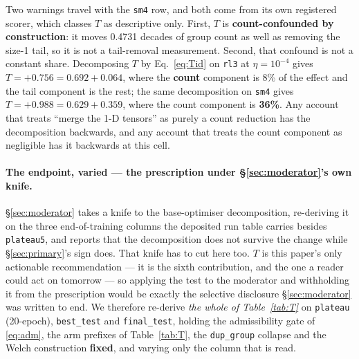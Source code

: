 \documentclass[10pt,letterpaper]{article}
\newcommand{\Tstat}{T}                         %
\newcommand{\plateau}{\texttt{plateau5}}
\newcommand{\arm}[1]{\texttt{#1}}
\begin{document}
Two warnings travel with the \arm{sm4} row, and both come from its own registered scorer, which
classes $\Tstat$ as descriptive only. First, $\Tstat$ is \textbf{count-confounded by
construction}: it moves 0.4731 decades of group count as well as removing the size-1 tail, so it
is not a tail-removal measurement. Second, that confound is not a constant share.
Decomposing $\Tstat$ by Eq.~\ref{eq:Tid} on \arm{rl3} at $\eta = 10^{-4}$ gives
$\Tstat = +0.756 = 0.692 + 0.064$, where the \textbf{count} component is 8\% of the effect and
the tail component is the rest; the same decomposition on \arm{sm4} gives
$\Tstat = +0.988 = 0.629 + 0.359$, where the count component is \textbf{36\%}. Any account that
treats ``merge the 1-D tensors'' as purely a count reduction has the decomposition backwards, and
any account that treats the count component as negligible has it backwards at this cell.

\paragraph{The endpoint, varied --- the prescription under \S\ref{sec:moderator}'s own knife.}
\S\ref{sec:moderator} takes a knife to the base-optimiser decomposition, re-deriving it on the
three end-of-training columns the deposited run table carries besides \plateau{}, and reports
that the decomposition does not survive the change while \S\ref{sec:primary}'s sign does. That
knife has to cut here too. $\Tstat$ is this paper's only actionable recommendation --- it is the
sixth contribution, and the one a reader could act on tomorrow --- so applying the test to the
moderator and withholding it from the prescription would be exactly the selective disclosure
\S\ref{sec:moderator} was written to end. We therefore re-derive \emph{the whole of
Table~\ref{tab:T}} on \texttt{plateau} (20-epoch), \texttt{best\_test} and \texttt{final\_test},
holding the admissibility gate of \eqref{eq:adm}, the arm prefixes of Table~\ref{tab:T}, the
\texttt{dup\_group} collapse and the Welch construction \textbf{fixed}, and varying only the
column that is read.
\end{document}

